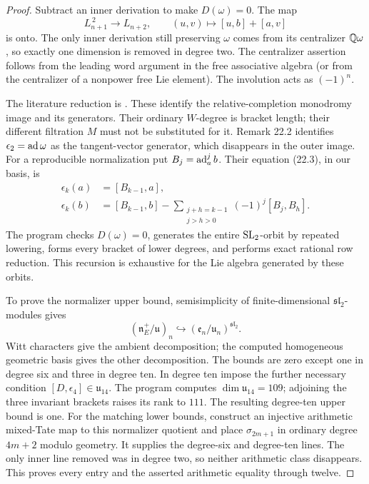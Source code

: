 \begin{proof}
Subtract an inner derivation to make $D(\omega)=0$.
The map
\[
 L_{n+1}^{\,2}\longrightarrow L_{n+2},\qquad
 (u,v)\longmapsto[u,b]+[a,v]
\]
is onto. The only inner derivation still preserving
$\omega$ comes from its centralizer $\mathbb Q\omega$,
so exactly one dimension is removed in degree two.
The centralizer assertion follows from the leading
word argument in the free associative algebra
(or from the centralizer of a nonpower free Lie
element). The involution acts as $(-1)^n$.

The literature reduction is
\citet[Theorem 10.7, Proposition 20.1,
Corollary 20.2, Theorem 22.3, Corollary 23.3]{HainMatsumoto2020}.
These identify the relative-completion monodromy
image and its generators. Their ordinary $W$-degree
is bracket length; their different filtration $M$
must not be substituted for it. Remark 22.2 identifies
$\epsilon_2=\operatorname{ad}\omega$ as the tangent-vector
generator, which disappears in the outer image.
For a reproducible normalization put $B_j=\operatorname{ad}_a^j b$.
Their equation (22.3), in our basis, is
\[
\begin{split}
 \epsilon_k(a)&=[B_{k-1},a],\\
 \epsilon_k(b)&=[B_{k-1},b]
 -\sum_{\substack{j+h=k-1\\j>h>0}}(-1)^j[B_j,B_h].
\end{split}
\]
The program checks $D(\omega)=0$, generates the
entire $\operatorname{SL}_2$-orbit by repeated lowering, forms
every bracket of lower degrees, and performs exact
rational row reduction. This recursion is exhaustive
for the Lie algebra generated by these orbits.

To prove the normalizer upper bound, semisimplicity
of finite-dimensional $\mathfrak{sl}_2$-modules gives
\[
 (\mathfrak n_E^+/\mathfrak u)_n
 \hookrightarrow(\mathfrak e_n/\mathfrak u_n)^{\mathfrak{sl}_2}.
\]
Witt characters give the ambient decomposition;
the computed homogeneous geometric basis gives the
other decomposition. The bounds are zero except
one in degree six and three in degree ten.
In degree ten impose the further necessary condition
$[D,\epsilon_4]\in\mathfrak u_{14}$. The program
computes $\dim\mathfrak u_{14}=109$; adjoining the
three invariant brackets raises its rank to $111$.
The resulting degree-ten upper bound is one.
For the matching lower bounds,
\citet[Proposition 29.1 and Remark 29.3]{HainMatsumoto2020}
construct an injective arithmetic mixed-Tate map to
this normalizer quotient and place $\sigma_{2m+1}$
in ordinary degree $4m+2$ modulo geometry.
It supplies the degree-six and degree-ten lines.
The only inner line removed was in degree two,
so neither arithmetic class disappears. This proves
every entry and the asserted arithmetic equality
through twelve.
\end{proof}

